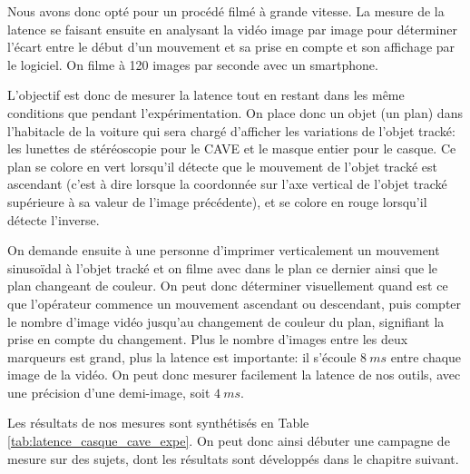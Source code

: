 	\par Nous avons donc opté pour un procédé filmé à grande vitesse. La mesure de la latence se faisant ensuite en analysant la vidéo image par image pour déterminer l'écart entre le début d'un mouvement et sa prise en compte et son affichage par le logiciel. On filme à 120 images par seconde avec un smartphone.
	
	\par L'objectif est donc de mesurer la latence tout en restant dans les même conditions que pendant l'expérimentation. On place donc un objet (un plan) dans l'habitacle de la voiture qui sera chargé d'afficher les variations de l'objet tracké: les lunettes de stéréoscopie pour le CAVE et le masque entier pour le casque. Ce plan se colore en vert lorsqu'il détecte que le mouvement de l'objet tracké est ascendant (c'est à dire lorsque la coordonnée sur l'axe vertical de l'objet tracké supérieure à sa valeur de l'image précédente), et se colore en rouge lorsqu'il détecte l'inverse.
	
	\par On demande ensuite à une personne d'imprimer verticalement un mouvement sinusoïdal à l'objet tracké et on filme avec dans le plan ce dernier ainsi que le plan changeant de couleur. On peut donc déterminer visuellement quand est ce que l'opérateur commence un mouvement ascendant ou descendant, puis compter le nombre d'image vidéo jusqu'au changement de couleur du plan, signifiant la prise en compte du changement. Plus le nombre d'images entre les deux marqueurs est grand, plus la latence est importante: il s'écoule $8~ms$ entre chaque image de la vidéo. On peut donc mesurer facilement la latence de nos outils, avec une précision d'une demi-image, soit $4~ms$.
	
	\par Les résultats de nos mesures sont synthétisés en Table \ref{tab:latence_casque_cave_expe}. On peut donc ainsi débuter une campagne de mesure sur des sujets, dont les résultats sont développés dans le chapitre suivant.
	
